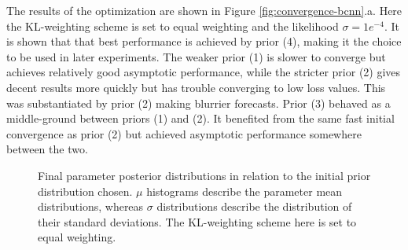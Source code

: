 The results of the optimization are shown in Figure \ref{fig:convergence-bcnn}.a. Here the KL-weighting scheme is set to equal weighting and the likelihood $\sigma = 1e^{-4}$. It is shown that that best performance is achieved by prior (4), making it the choice to be used in later experiments. The weaker prior (1) is slower to converge but achieves relatively good asymptotic performance, while the stricter prior (2) gives decent results more quickly but has trouble converging to low loss values. This was substantiated by prior (2) making blurrier forecasts. Prior (3) behaved as a middle-ground between priors (1) and (2). It benefited from the same fast initial convergence as prior (2) but achieved asymptotic performance somewhere between the two. 

\begin{figure}[H]
	\centering
	

	

	
	\caption{Final parameter posterior distributions in relation to the initial prior distribution chosen. $\mu$ histograms describe the parameter mean distributions, whereas $\sigma$ distributions describe the distribution of their standard deviations. The KL-weighting scheme here is set to equal weighting.}
	\label{fig:bcnn-prior-weights}
\end{figure}

